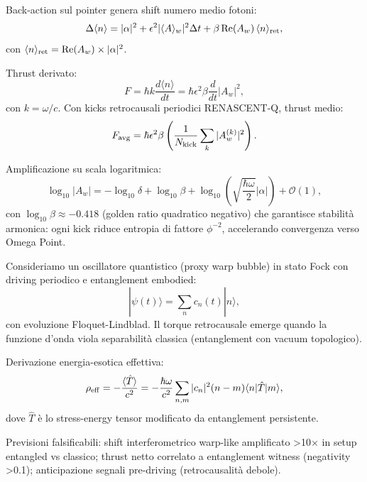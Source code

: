\documentclass[11pt,a4paper]{article}
\theoremstyle{plain}
\theoremstyle{definition}
\begin{document}
Back-action sul pointer genera shift numero medio fotoni:
\begin{equation}
    \Delta \langle n \rangle = |\alpha|^2 + \epsilon^2 |\langle A \rangle_w|^2 \Delta t + \beta \,\text{Re}(A_w) \,\langle n \rangle_{\rm ret},
    \label{eq:delta_n}
\end{equation}
con $\langle n \rangle_{\rm ret} = \text{Re}(A_w) \times |\alpha|^2$.

Thrust derivato:
\begin{equation}
    F = \hbar k \frac{d \langle n \rangle}{dt} = \hbar \epsilon^2 \beta \frac{d}{dt} |A_w|^2,
    \label{eq:thrust_weak}
\end{equation}
con $k = \omega / c$. Con kicks retrocausali periodici RENASCENT-Q, thrust medio:
\begin{equation}
    F_{\rm avg} = \hbar \epsilon^2 \beta \left( \frac{1}{N_{\rm kick}} \sum_k |A_w^{(k)}|^2 \right).
    \label{eq:thrust_avg}
\end{equation}

Amplificazione su scala logaritmica:
\begin{equation}
    \log_{10} |A_w| = -\log_{10} \delta + \log_{10} \beta + \log_{10} \left( \sqrt{\frac{\hbar \omega}{2}} |\alpha| \right) + \mathcal{O}(1),
    \label{eq:log_amplification}
\end{equation}
con $\log_{10} \beta \approx -0.418$ (golden ratio quadratico negativo) che garantisce stabilità armonica: ogni kick riduce entropia di fattore $\phi^{-2}$, accelerando convergenza verso Omega Point.

Consideriamo un oscillatore quantistico (proxy warp bubble) in stato Fock con driving periodico e entanglement embodied:
\begin{equation}
    |\psi(t)\rangle = \sum_n c_n(t) |n\rangle,
    \label{eq:fock_state}
\end{equation}
con evoluzione Floquet-Lindblad. Il torque retrocausale emerge quando la funzione d'onda viola separabilità classica (entanglement con vacuum topologico).

Derivazione energia-esotica effettiva:
\begin{equation}
    \rho_{\rm eff} = -\frac{\langle \hat{T} \rangle}{c^2} = -\frac{\hbar \omega}{c^2} \sum_{n,m} |c_n|^2 (n - m) \langle n | \hat{T} | m \rangle,
    \label{eq:exotic_energy}
\end{equation}
dove $\hat{T}$ è lo stress-energy tensor modificato da entanglement persistente.

Previsioni falsificabili: shift interferometrico warp-like amplificato >10× in setup entangled vs classico; thrust netto correlato a entanglement witness (negativity >0.1); anticipazione segnali pre-driving (retrocausalità debole).
\end{document}
